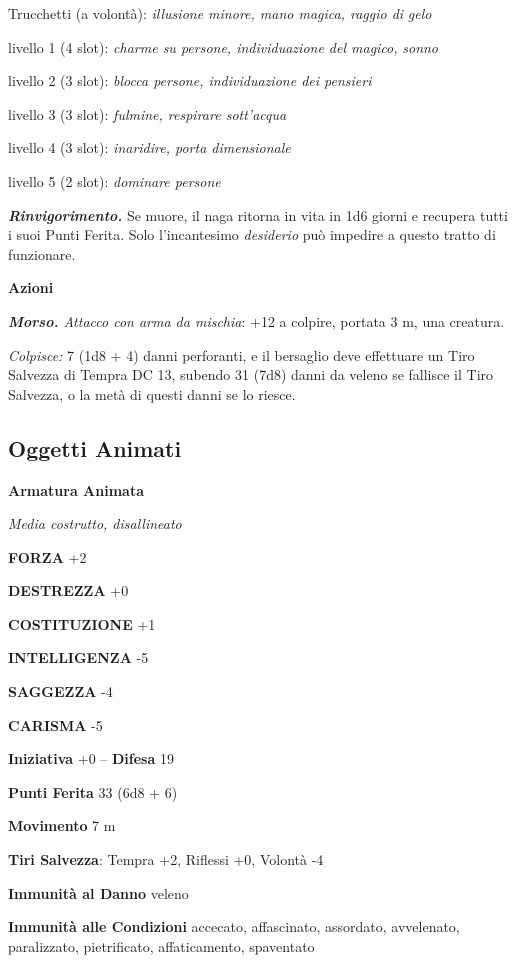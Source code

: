 \begin{multicols}{2}
Trucchetti (a volontà): \textit{illusione minore, mano magica, raggio di} \textit{gelo}

livello 1 (4 slot): \textit{charme su persone, individuazione del magico,} \textit{sonno}

livello 2 (3 slot): \textit{blocca persone, individuazione dei pensieri}

livello 3 (3 slot): \textit{fulmine, respirare sott'acqua}

livello 4 (3 slot): \textit{inaridire, porta dimensionale}

livello 5 (2 slot): \textit{dominare persone}

\textit{\textbf{Rinvigorimento.}} Se muore, il naga ritorna in vita in 1d6 giorni e recupera tutti i suoi Punti Ferita. Solo l'incantesimo \textit{desiderio} può impedire a questo tratto di funzionare.

\textbf{Azioni}

\textit{\textbf{Morso.} Attacco con arma da mischia}: +12 a colpire, portata 3 m, una creatura.

\textit{Colpisce:} 7 (1d8 + 4) danni perforanti, e il bersaglio deve effettuare un Tiro Salvezza di Tempra DC 13, subendo 31 (7d8) danni da veleno se fallisce il Tiro Salvezza, o la metà di questi danni se lo riesce.

\subsection{Oggetti Animati}

\medskip{}\textbf{Armatura Animata}

\textit{Media costrutto, disallineato}

\textbf{FORZA} +2

\textbf{DESTREZZA} +0

\textbf{COSTITUZIONE} +1

\textbf{INTELLIGENZA} -5

\textbf{SAGGEZZA} -4

\textbf{CARISMA} -5

\textbf{Iniziativa} +0 -- \textbf{Difesa} 19

\textbf{Punti Ferita} 33 (6d8 + 6)

\textbf{Movimento} 7 m

\textbf{Tiri Salvezza}: Tempra +2, Riflessi +0, Volontà -4

\textbf{Immunità al Danno} veleno

\textbf{Immunità alle Condizioni} accecato, affascinato, assordato, avvelenato, paralizzato, pietrificato, affaticamento, spaventato


\end{multicols}
